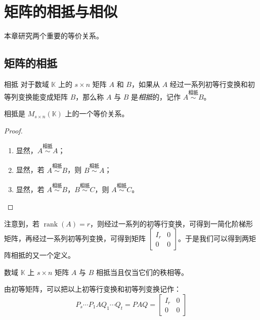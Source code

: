 
\chapter{矩阵的相抵与相似}

本章研究两个重要的等价关系。

\section{矩阵的相抵}

\begin{definition}{相抵}
	对于数域 $\mathbb K$ 上的 $s \times n$ 矩阵 $A$ 和 $B$，如果从 $A$ 经过一系列初等行变换和初等列变换能变成矩阵 $B$，那么称 $A$ 与 $B$ 是\emph{相抵}的，记作 $A \stackrel{\text{相抵}}{\sim} B$。
\end{definition}

\begin{theorem}
	相抵是 $M_{s \times n}(\mathbb K)$ 上的一个等价关系。
\end{theorem}

\begin{proof}
	\begin{enumerate}
		\item 显然，$A \stackrel{\text{相抵}}{\sim} A$；
		\item 显然，若 $A \stackrel{\text{相抵}}{\sim} B$，则 $B \stackrel{\text{相抵}}{\sim} A$；
		\item 显然，若 $A \stackrel{\text{相抵}}{\sim} B$，$B \stackrel{\text{相抵}}{\sim} C$，则 $A \stackrel{\text{相抵}}{\sim} C$。
	\end{enumerate}
\end{proof}

注意到，若 $\operatorname{rank}(A) = r$，则经过一系列的初等行变换，可得到一简化阶梯形矩阵，再经过一系列初等列变换，可得到矩阵 $\begin{bmatrix} I_r & 0 \\ 0 & 0 \end{bmatrix}$。于是我们可以得到两矩阵相抵的又一个定义。

\begin{theorem}
	数域 $\mathbb K$ 上 $s \times n$ 矩阵 $A$ 与 $B$ 相抵当且仅当它们的秩相等。
\end{theorem}

由初等矩阵，可以把以上初等行变换和初等列变换记作：
$$
P_s \cdots P_1 A Q_1 \cdots Q_t = PAQ = \begin{bmatrix} I_r & 0 \\ 0 & 0 \end{bmatrix}
$$

